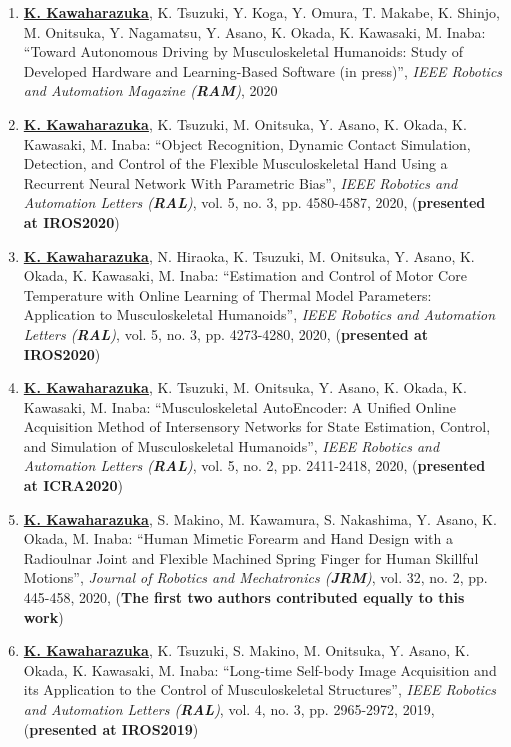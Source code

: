 \documentclass[letterpaper]{article}
\begin{document}
\begin{enumerate}
\item \underline{\textbf{K. Kawaharazuka}}, K. Tsuzuki, Y. Koga, Y. Omura, T. Makabe, K. Shinjo, M. Onitsuka, Y. Nagamatsu, Y. Asano, K. Okada, K. Kawasaki, M. Inaba: ``Toward Autonomous Driving by Musculoskeletal Humanoids: Study of Developed Hardware and Learning-Based Software (in press)'', \textit{IEEE Robotics and Automation Magazine (\textit{\textbf{RAM}})}, 2020
\item \underline{\textbf{K. Kawaharazuka}}, K. Tsuzuki, M. Onitsuka, Y. Asano, K. Okada, K. Kawasaki, M. Inaba: ``Object Recognition, Dynamic Contact Simulation, Detection, and Control of the Flexible Musculoskeletal Hand Using a Recurrent Neural Network With Parametric Bias'', \textit{IEEE Robotics and Automation Letters (\textit{\textbf{RAL}})}, vol. 5, no. 3, pp. 4580-4587, 2020, (\textbf{presented at IROS2020})
\item \underline{\textbf{K. Kawaharazuka}}, N. Hiraoka, K. Tsuzuki, M. Onitsuka, Y. Asano, K. Okada, K. Kawasaki, M. Inaba: ``Estimation and Control of Motor Core Temperature with Online Learning of Thermal Model Parameters: Application to Musculoskeletal Humanoids'', \textit{IEEE Robotics and Automation Letters (\textit{\textbf{RAL}})}, vol. 5, no. 3, pp. 4273-4280, 2020, (\textbf{presented at IROS2020})
\item \underline{\textbf{K. Kawaharazuka}}, K. Tsuzuki, M. Onitsuka, Y. Asano, K. Okada, K. Kawasaki, M. Inaba: ``Musculoskeletal AutoEncoder: A Unified Online Acquisition Method of Intersensory Networks for State Estimation, Control, and Simulation of Musculoskeletal Humanoids'', \textit{IEEE Robotics and Automation Letters (\textit{\textbf{RAL}})}, vol. 5, no. 2, pp. 2411-2418, 2020, (\textbf{presented at ICRA2020})
\item \underline{\textbf{K. Kawaharazuka}}, S. Makino, M. Kawamura, S. Nakashima, Y. Asano, K. Okada, M. Inaba: ``Human Mimetic Forearm and Hand Design with a Radioulnar Joint and Flexible Machined Spring Finger for Human Skillful Motions'', \textit{Journal of Robotics and Mechatronics (\textit{\textbf{JRM}})}, vol. 32, no. 2, pp. 445-458, 2020, (\textbf{The first two authors contributed equally to this work})
\item \underline{\textbf{K. Kawaharazuka}}, K. Tsuzuki, S. Makino, M. Onitsuka, Y. Asano, K. Okada, K. Kawasaki, M. Inaba: ``Long-time Self-body Image Acquisition and its Application to the Control of Musculoskeletal Structures'', \textit{IEEE Robotics and Automation Letters (\textit{\textbf{RAL}})}, vol. 4, no. 3, pp. 2965-2972, 2019, (\textbf{presented at IROS2019})

\end{enumerate}
\end{document}
